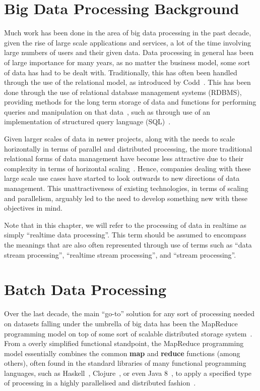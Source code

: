 

\section{Big Data Processing Background} %
\label{sec:big_data_processing_background}

Much work has been done in the area of big data processing in the past decade, given the rise of large
scale applications and services, a lot of the time involving large numbers of users and their given data.
Data processing in general has been of large importance for many years, as no matter the business model,
some sort of data has had to be dealt with. Traditionally, this has often been handled through the use of
the relational model, as introduced by Codd~\cite{codd1970relational}. This has been done through the use of relational database
management systems (RDBMS), providing methods for the long term storage of
data and functions for performing queries and manipulation on that data~\cite{astrahan1976system},
such as through use of an implementation of structured query language (SQL)~\cite{chamberlin1974sequel}.

Given larger scales of data in newer projects, along with the needs to scale horizontally in terms of
parallel and distributed processing, the more traditional relational forms of data management have become
less attractive due to their complexity in terms of horizontal scaling~\cite{agrawal2011big}. Hence,
companies dealing with these large scale use cases have started to look outwards to new directions of
data management. This unattractiveness of existing technologies, in terms of scaling and parallelism,
arguably led to the need to develop something new with these objectives in mind.

Note that in this chapter, we will refer to the processing of data in realtime as simply ``realtime data
processing''. This term should be assumed to encompass the meanings that are also often represented through
use of terms such as ``data stream processing'', ``realtime stream processing'', and ``stream processing''.


\section{Batch Data Processing} %
\label{sub:batch_data_processing}

Over the last decade, the main ``go-to'' solution for any sort of processing needed on datasets falling under
the umbrella of big data has been the MapReduce programming model on top of some sort of scalable distributed
storage system~\cite{bifet_mining_2013}. From a overly simplified functional standpoint, the MapReduce
programming model essentially combines the common \textbf{map} and \textbf{reduce} functions (among others),
often found in the standard libraries of many functional programming languages, such as
Haskell~\cite{lammel2008google}, Clojure~\cite{hickey2008clojure}, or even Java 8~\cite{su2014changing}, to
apply a specified type of processing in a highly parallelised and distributed fashion~\cite{yang2007map}.

